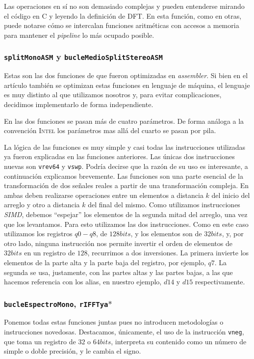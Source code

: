 \documentclass[%
    compressed,
    titlepage,
    narroweqnarray,
    inline,
    twoside,
    ]{ieee}
\begin{document}
Las operaciones en s\'i no son demasiado complejas y pueden entenderse mirando el c\'odigo en \textsc{C} y leyendo la definici\'on de \textsc{DFT}.
En esta funci\'on, como en otras, puede notarse c\'omo se intercalan funciones aritm\'eticas con accesos a memoria para mantener el \textit{pipeline}
lo m\'as ocupado posible.


\subsubsection{\texttt{splitMonoASM} y \texttt{bucleMedioSplitStereoASM}}
Estas son las dos funciones de \cite{realdft} que fueron optimizadas en \textit{assembler}. Si bien en el art\'iculo tambi\'en se optimizan
estas funciones en lenguaje de m\'aquina, el lenguaje es muy distinto al que utilizamos nosotros y, para evitar complicaciones, decidimos
implementarlo de forma independiente.

En las dos funciones se pasan m\'as de cuatro par\'ametros. De forma an\'aloga a la convenci\'on \textsc{Intel} los par\'ametros mas all\'a
del cuarto se pasan por pila.

La l\'ogica de las funciones es muy simple y casi todas las instrucciones utilizadas ya fueron explicadas en las funciones anteriores.
Las \'unicas dos instrucciones nuevas son \texttt{vrev64} y \texttt{vswp}.
Podr\'ia decirse que la raz\'on de su uso es interesante, a continuaci\'on explicamos brevemente.
Las funciones son una parte esencial de la transformaci\'on de dos se\~nales reales a partir de una transformaci\'on compleja.
En ambas deben realizarse operaciones entre un elementos a distancia $k$ del inicio del arreglo y otro a distancia $k$ del final del mismo.
Como utilizamos instrucciones \textit{SIMD}, debemos ``espejar'' los elementos de la segunda mitad del arreglo, una vez que los levantamos.
Para esto utilizamos las dos instrucciones. Como en este caso utilizamos los registros $q0-q8$, de $128 bits$, y los elementos son de
$32 bits$, y, por otro lado, ninguna instrucci\'on nos permite invertir el orden de elementos de $32 bits$ en un registro de $128$, recurrimos
a dos inversiones. La primera invierte los elementos de la parte alta y la parte baja del registro, por ejemplo, $q7$. La segunda se usa, justamente,
con las partes altas y las partes bajas, a las que hacemos referencia con los alias, en nuestro ejemplo, $d14$ y $d15$ respectivamente.

\subsubsection{\texttt{bucleEspectroMono}, \texttt{rIFFTya$\ast$}}
Ponemos todas estas funciones juntas pues no introducen metodolog\'ias o instrucciones novedosas.
Destacamos, \'unicamente, el uso de la instrucci\'on \texttt{vneg}, que toma un registro de $32$ o $64bits$, interpreta su contenido como un n\'umero de simple
o doble precisi\'on, y le cambia el signo.
\end{document}
